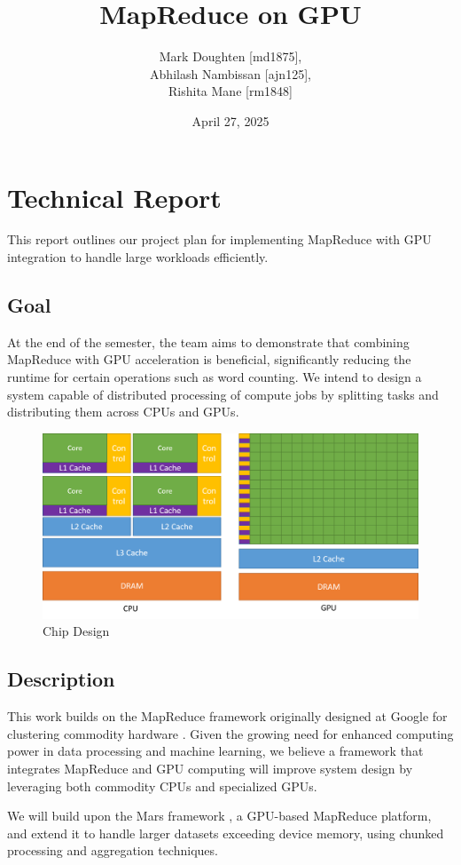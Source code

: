 \documentclass{article}
\title{MapReduce on GPU}
\author{Mark Doughten [md1875], \\ Abhilash Nambissan [ajn125], \\ Rishita Mane [rm1848]}
\date{April 27, 2025}
\begin{document}
\maketitle

\section{Technical Report}

This report outlines our project plan for implementing MapReduce with GPU integration to handle large workloads efficiently.

\subsection{Goal}
At the end of the semester, the team aims to demonstrate that combining MapReduce with GPU acceleration is beneficial, significantly reducing the runtime for certain operations such as word counting. We intend to design a system capable of distributed processing of compute jobs by splitting tasks and distributing them across CPUs and GPUs.

\begin{figure}[ht]
    \centering
    \includegraphics[width=.8\linewidth]{./images/chips.png}
    \caption{Chip Design \cite{cuda_docs}}
    \label{fig:mapreduce}
\end{figure}

\subsection{Description}
This work builds on the MapReduce framework originally designed at Google for clustering commodity hardware \cite{mapreduce}. Given the growing need for enhanced computing power in data processing and machine learning, we believe a framework that integrates MapReduce and GPU computing will improve system design by leveraging both commodity CPUs and specialized GPUs.

We will build upon the Mars framework \cite{mars}, a GPU-based MapReduce platform, and extend it to handle larger datasets exceeding device memory, using chunked processing and aggregation techniques.
\end{document}
